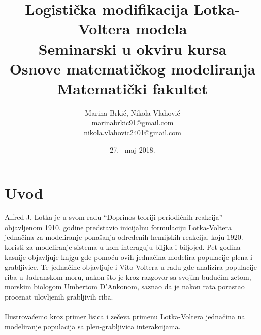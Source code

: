 \documentclass[a4paper]{article}
\begin{document}
\title{Logistička modifikacija Lotka-Voltera modela\\
	\small{Seminarski u okviru kursa\\Osnove matematičkog modeliranja\\Matematički fakultet}
}
\author{Marina Brkić, Nikola Vlahović\\marinabrkic91@gmail.com\\nikola.vlahovic2401@gmail.com}
\date{27. ~maj 2018.}
\maketitle
{}
\tableofcontents

\newpage

\section{Uvod}
\label{sec:uvod}

Alfred J. Lotka je u svom radu ``Doprinos teoriji periodičnih reakcija'' objavljenom 1910. godine predstavio
inicijalnu formulaciju Lotka-Voltera jednačina za modeliranje ponašanja određenih hemijskih reakcija, koju
1920. koristi za modeliranje sistema u kom interaguju biljka i biljojed. Pet godina kasnije objavljuje knjgu
gde pomoću ovih jednačina modelira populacije plena i grabljivice. Te jednačine objavljuje i Vito Voltera
u radu gde analizira populacije riba u Jadranskom moru, nakon što je kroz razgovor sa svojim budućim zetom,
morskim biologom Umbertom D'Ankonom, saznao da je nakon rata porastao procenat ulovljenih grabljivih riba.
\\\\

Ilustrovaćemo kroz primer lisica i zečeva primenu Lotka-Voltera jednačina na modeliranje
populacija sa plen-grabljivica interakcijama.
\end{document}
